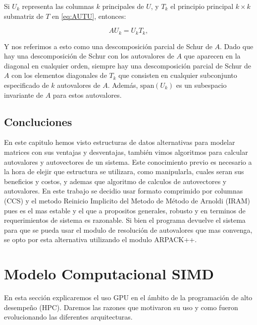 \documentclass[a4paper,openright,12pt, oneside]{book}
\begin{document}
Si $ U_k $ representa las columnas $ k $ principales de $ U $, y $ T_k $ el principio principal $ k \times k $ submatriz de $ T $ en \ref{eq:AUTU}, entonces:

\begin{displaymath}
A U_k = U_k T_k,
\end{displaymath}

Y nos referimos a esto como una descomposici\'on parcial de Schur de $ A $. Dado que hay una descomposici\'on de Schur con los autovalores de $ A $ que aparecen en la diagonal en cualquier orden, siempre hay una descomposici\'on parcial de Schur de $ A $ con los elementos diagonales de $ T_k $ que consisten en cualquier subconjunto especificado de $ k $ autovalores de $ A $. Adem\'as, $ \mbox{span} (U_k) $ es un subespacio invariante de $ A $ para estos autovalores.

\section{Concluciones}

En este capitulo hemos visto estructuras de datos alternativas para modelar matrices con sus ventajas y desventajas, tambi\'en vimos algoritmos para calcular autovalores y autovectores de un sistema. Este conocimiento previo es necesario a la hora de elejir que estructura se utilizara, como manipularla, cuales seran sus beneficios y costos, y ademas que algoritmo de calculos de autovectores y autovalores.
En este trabajo se decidio usar formato comprimido por columnas (CCS) y el metodo Reinicio Implicito del Metodo de M\'etodo de Arnoldi (IRAM) pues es el mas estable y el que a propositos generales, robusto y en terminos de requerimientos de sistema es razonable. Si bien el programa devuelve el sistema para que se pueda usar el modulo de resoluci\'on de autovalores que mas convenga, se opto por esta alternativa utilizando el modulo ARPACK++.



\setcounter{chapter}{3}
\setcounter{section}{0}
\chapter*{Modelo Computacional SIMD}\label{Modelo Computacional SIMD}
\markboth{}{} %

En esta secci\'on explicaremos el uso  GPU en el \'ambito de la programaci\'on de alto desempe\~no (HPC). Daremos las razones que motivaron su uso y como fueron evolucionando las diferentes arquitecturas.
\end{document}
